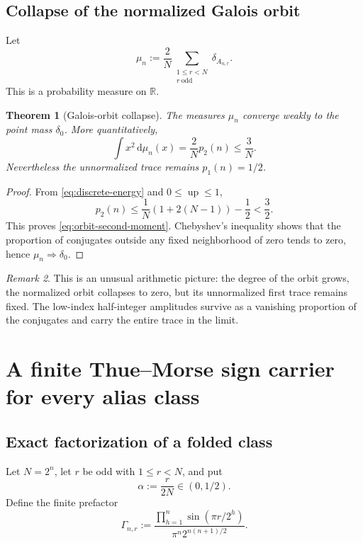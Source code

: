 \documentclass[11pt,oneside]{article}
\newtheorem{theorem}{Theorem}[section]
\theoremstyle{definition}
\theoremstyle{remark}
\newtheorem{remark}[theorem]{Remark}
\newcommand{\R}{\mathbb R}
\newcommand{\Up}{\operatorname{up}}
\newcommand{\dd}{\,\mathrm d}
\begin{document}
\subsection{Collapse of the normalized Galois orbit}

Let
\begin{equation}\label{eq:empirical-measure}
 \mu_n:=\frac2N
 \sum_{\substack{1\le r<N\\r\ \mathrm{odd}}}\delta_{A_{n,r}}.
\end{equation}
This is a probability measure on $\R$.

\begin{theorem}[Galois-orbit collapse]\label{thm:orbit-collapse}
The measures $\mu_n$ converge weakly to the point mass $\delta_0$.  More
quantitatively,
\begin{equation}\label{eq:orbit-second-moment}
 \int x^2\dd\mu_n(x)=\frac2N p_2(n)\le\frac3N.
\end{equation}
Nevertheless the unnormalized trace remains $p_1(n)=1/2$.
\end{theorem}

\begin{proof}
From \eqref{eq:discrete-energy} and $0\le\Up\le1$,
\[
 p_2(n)\le\frac1N(1+2(N-1))-\frac12<\frac32.
\]
This proves \eqref{eq:orbit-second-moment}.  Chebyshev's inequality shows that
the proportion of conjugates outside any fixed neighborhood of zero tends to
zero, hence $\mu_n\Rightarrow\delta_0$.
\end{proof}

\begin{remark}
This is an unusual arithmetic picture: the degree of the orbit grows, the
normalized orbit collapses to zero, but its unnormalized first trace remains
fixed.  The low-index half-integer amplitudes survive as a vanishing proportion
of the conjugates and carry the entire trace in the limit.
\end{remark}

\section{A finite Thue--Morse sign carrier for every alias class}\label{sec:sign-carrier}

\subsection{Exact factorization of a folded class}

Let $N=2^n$, let $r$ be odd with $1\le r<N$, and put
\begin{equation}\label{eq:a-shift}
 \alpha:=\frac{r}{2N}\in(0,1/2).
\end{equation}
Define the finite prefactor
\begin{equation}\label{eq:Gamma-n-r}
 \Gamma_{n,r}:=
 \frac{\displaystyle\prod_{h=1}^{n}\sin(\pi r/2^h)}
      {\pi^n2^{n(n+1)/2}}.
\end{equation}
\end{document}
